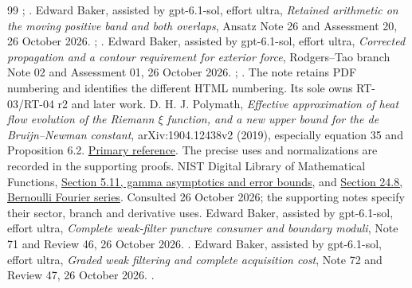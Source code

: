 \begin{thebibliography}{99}
;
.
 Edward Baker, assisted by gpt-6.1-sol, effort ultra,
\emph{Retained arithmetic on the moving positive band and both overlaps},
Ansatz Note 26 and Assessment 20, 26 October 2026.
;
.
 Edward Baker, assisted by gpt-6.1-sol, effort ultra,
\emph{Corrected propagation and a contour requirement for exterior force},
Rodgers--Tao branch Note 02 and Assessment 01, 26 October 2026.
;
.
The note retains PDF numbering and identifies the different HTML numbering.
Its sole 
owns RT-03/RT-04 r2 and later work.
 D. H. J. Polymath,
\emph{Effective approximation of heat flow evolution of the Riemann
$\xi$ function, and a new upper bound for the de Bruijn--Newman constant},
arXiv:1904.12438v2 (2019), especially equation 35 and Proposition 6.2.
\href{https://arxiv.org/abs/1904.12438v2}{Primary reference}.
The precise uses and normalizations are recorded in the supporting proofs.
 NIST Digital Library of Mathematical Functions,
\href{https://dlmf.nist.gov/5.11}{Section 5.11, gamma asymptotics and error bounds},
and \href{https://dlmf.nist.gov/24.8}{Section 24.8, Bernoulli Fourier series}.
Consulted 26 October 2026; the supporting notes specify their sector,
branch and derivative uses.
 Edward Baker, assisted by gpt-6.1-sol, effort ultra,
\emph{Complete weak-filter puncture consumer and boundary moduli},
Note 71 and Review 46, 26 October 2026.
.
 Edward Baker, assisted by gpt-6.1-sol, effort ultra,
\emph{Graded weak filtering and complete acquisition cost},
Note 72 and Review 47, 26 October 2026.
.

\end{thebibliography}
